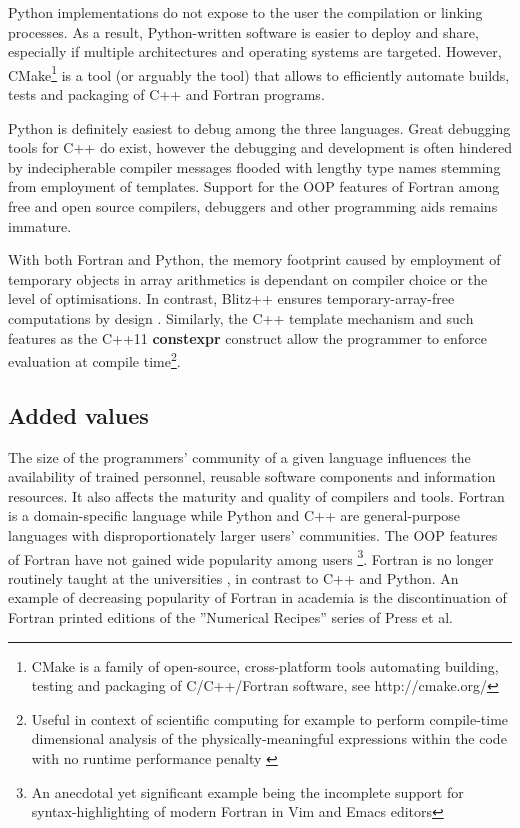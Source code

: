 \documentclass[final,5p,times,twocolumn]{elsarticle}
\newcommand{\prog}[1]{{\rm\bf#1}}
\begin{document}
  Python implementations do not expose to the user the compilation or linking processes. 
  As a result, Python-written software is easier to deploy and share, especially 
    if multiple architectures and operating systems are targeted.
  However, CMake\footnote{CMake is a family of open-source, cross-platform
    tools automating building, testing and packaging of C/C++/Fortran software,
    see http://cmake.org/}
    is a tool (or arguably the tool) that allows to efficiently automate 
    builds, tests and packaging of C++ and Fortran programs.

  Python is definitely easiest to debug among the three languages.
  Great debugging tools for C++ do exist, however the debugging and development is 
    often hindered by indecipherable compiler messages
    flooded with lengthy type names stemming from employment of templates.
  Support for the OOP features of Fortran among free and open source compilers, 
    debuggers and other programming aids remains immature.
    
  With both Fortran and Python, the memory footprint caused by employment
    of temporary objects in array arithmetics is dependant on compiler choice or
    the level of optimisations.
  In contrast, Blitz++ ensures temporary-array-free computations by design
    \citep{Veldhuizen_et_al_1997}.
  Similarly, the C++ template mechanism and such features as the C++11
    \prog{constexpr} construct allow the programmer to enforce evaluation
    at compile time\footnote{Useful in context of scientific computing for example to perform
    compile-time dimensional analysis of the physically-meaningful expressions within
    the code with no runtime performance penalty \citet{Schabel_et_al_2008}}.

  \subsection{Added values}

  The size of the programmers' community of a given language 
    influences the availability of trained personnel, 
    reusable software components and information resources.
  It also affects the maturity and quality of compilers and tools. 
  Fortran is a domain-specific language while Python and C++ are general-purpose languages
    with disproportionately larger users' communities.
  The OOP features of Fortran have not gained
    wide popularity among users \citep{Worth_2008}\footnote{An anecdotal yet significant
    example being the incomplete support for syntax-highlighting of modern Fortran in Vim and Emacs editors}.
  Fortran is no longer routinely taught at the universities \citep{Kendall_et_al_2008},
    in contrast to C++ and Python.
  An example of decreasing popularity of Fortran in academia 
    is the discontinuation of Fortran printed editions of the ''Numerical Recipes'' 
    series of Press et al.
 
\end{document}
